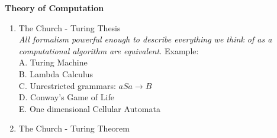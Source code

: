 \documentclass{article}
\begin{document}
\begin{center}
\begin{Huge}
\textbf{Theory of Computation}
\end{Huge}
\end{center}

\begin{LARGE}
\begin{enumerate}
    \item The Church - Turing Thesis\\
        \emph{All formalism powerful enough to describe everything we think of as a computational
        algorithm are equivalent.} Example:\\
        A. Turing Machine\\
        B. Lambda Calculus\\
        C. Unrestricted grammars: $aSa \rightarrow B$\\
        D. Conway's Game of Life\\
        E. One dimensional Cellular Automata\\
    \item The Church - Turing Theorem\\
\end{enumerate}
\end{LARGE}
\end{document}
